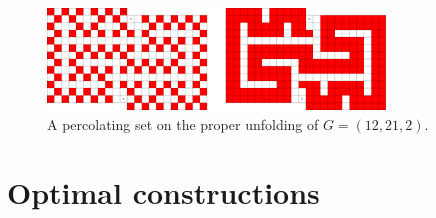 \begin{figure}[]
\centering
\includegraphics[width=0.8\textwidth]{figures/7/12x21x2_unfolded_lethal.pdf}
\caption{A percolating set on the proper unfolding of $G= (12,21,2)$.}
\label{fig:12x21x2_unfolded_lethal}
\end{figure} 

\section{Optimal constructions}




